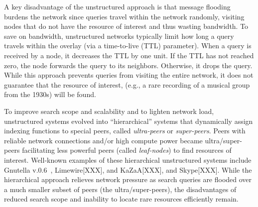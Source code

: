 A key disadvantage of the unstructured approach
is that message flooding burdens the network since queries travel within the
network randomly, visiting nodes that do not have the resource of interest
and thus wasting bandwidth.  To save on bandwidth, unstructured networks
typically limit how long a query travels within the overlay (via a
time-to-live (TTL) parameter).   When a query is received by a node, it decreases
the TTL by one unit.  If the TTL has not reached zero, the node
forwards the query to its neighbors.  Otherwise, it drops the query.  While
this approach prevents queries from visiting the entire network, it does
not guarantee that the resource of interest, (e.g., a rare recording 
of a musical group from
the 1930s) will be found.

To improve search scope and scalability and to lighten network load, 
unstructured systems evolved into ``hierarchical'' systems that dynamically
assign indexing functions to special peers,
called \emph{ultra-peers}  or \emph{super-peers}.
Peers with reliable network connections
and/or high compute power became ultra/super-peers facilitating less 
powerful peers (called \emph{leaf-nodes}) to find resources of interest.
Well-known examples of these hierarchical unstructured systems include
Gnutella v.0.6~\cite{gnutella}, Limewire[XXX], and KaZaA[XXX], and Skype[XXX]. 
While the hierarchical approach relieves network pressure as search
queries are flooded over a much smaller subset of peers (the ultra/super-peers),
the disadvantages of reduced search scope and inability to locate
rare resources efficiently remain.


